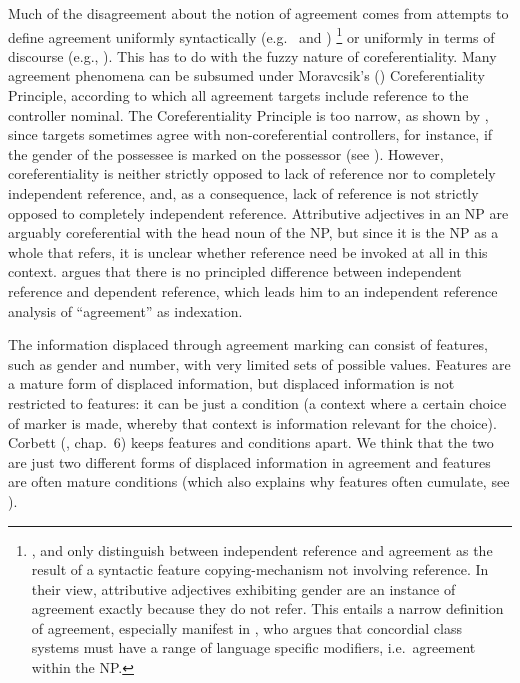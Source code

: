 \documentclass[output=collectionpaper]{langsci/langscibook}
\begin{document}
\largerpage
Much of the disagreement about the notion of agreement comes from attempts to define agreement uniformly syntactically (e.g.\ \citealt{Hengeveld2012} and \citealt{Passer2016b})%
\footnote{%
\cite{Hengeveld2012}, \cite{Rijn2016} and \cite{Passer2016b} only distinguish between independent reference and agreement as the result of a syntactic feature copying-mechanism not involving reference. In their view, attributive adjectives exhibiting gender are an instance of agreement exactly because they do not refer. This entails a narrow definition of agreement, especially manifest in \cite[86]{Passer2016b}, who argues that concordial class systems must have a range of language specific modifiers, i.e.\ agreement within the NP.
} %
or uniformly in terms of discourse (e.g., \citealt{Barlow1999}). This has to do with the fuzzy nature of coreferentiality. Many agreement phenomena can be subsumed under Moravcsik's (\citeyear[363]{Moravcsik1978}) Coreferentiality Principle, according to which all agreement targets include reference to the controller nominal. The Coreferentiality Principle is too narrow, as shown by \cite{Corbett2006}, since targets sometimes agree with non-coreferential controllers, for instance, if the gender of the possessee is marked on the possessor (see ). However, coreferentiality is neither strictly opposed to lack of reference nor to completely independent reference, and, as a consequence, lack of reference is not strictly opposed to completely independent reference. Attributive adjectives in an NP are arguably coreferential with the head noun of the NP, but since it is the NP as a whole that refers, it is unclear whether reference need be invoked at all in this context. \cite{Croft2013} argues that there is no principled difference between independent reference and dependent reference, which leads him to an independent reference analysis of ``agreement'' as indexation.

The information displaced through agreement marking can consist of features, such as gender and number, with very limited sets of possible values. Features are a mature form of displaced information, but displaced information is not restricted to features: it can be just a condition (a context where a certain choice of marker is made, whereby that context is information relevant for the choice). Corbett (\citeyear{Corbett2006}, chap.~6) keeps features and conditions apart. We think that the two are just two different forms of displaced information in agreement and features are often mature conditions (which also explains why features often cumulate, see ).
\end{document}
